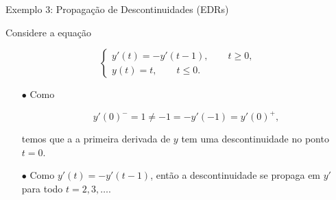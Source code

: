 \documentclass{beamer}
\theoremstyle{plain}
\theoremstyle{definition}
\begin{document}

\begin{frame}{Exemplo 3: Propagação de Descontinuidades (EDRs)}

     Considere a equação 

     \begin{equation}
       \begin{cases}
          y'(t) = -y'(t - 1), \qquad t \geq 0,  \\
          y(t) = t, \qquad t \leq 0.
       \end{cases}
      \label{chap1:ex5:eq:1}
     \end{equation}

     \begin{itemize}
         \item[$\bullet$] Como 

             \[
                 y'(0)^- = 1 \neq -1 = - y'(-1) = y'(0)^+,
             \]

             \noindent
             temos que a a primeira derivada de $y$ tem uma descontinuidade no ponto $t = 0$.
         \item[$\bullet$] Como $y'(t) = -y'(t - 1)$, então a descontinuidade se propaga em $y'$ para todo $t = 2, 3, \dots$. 

     \end{itemize}

\end{frame}

\end{document}

